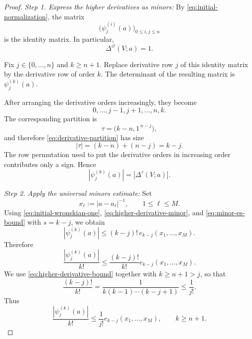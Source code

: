 \documentclass[12pt,letterpaper,reqno]{amsart}
\theoremstyle{definition}
\numberwithin{equation}{section}
\begin{document}
\begin{proof}

\medskip\noindent
\emph{{Step 1. Express the higher derivatives as minors:}}
By \eqref{eq:initial-normalization}, the matrix
\[
\bigl(\psi_j^{(i)}(a)\bigr)_{0\leq i,j\leq n}
\]
is the identity matrix. In particular,
\begin{equation}\label{eq:initial-wronskian-one}
 \Delta^\varnothing(V;a)=1.
\end{equation}

Fix \(j\in\{0,\ldots,n\}\) and \(k\geq n+1\). Replace derivative row
\(j\) of this identity matrix by the derivative row of order \(k\).
The determinant of the resulting matrix is
\(\psi_j^{(k)}(a)\).

After arranging the derivative orders increasingly, they become
\[
0,\ldots,j-1,j+1,\ldots,n,k.
\]
The corresponding partition is
\begin{equation}\label{eq:derivative-partition}
 \tau=
 \bigl(k-n,1^{\,n-j}\bigr),
\end{equation}
and therefore \eqref{eq:derivative-partition} has size
\[
|\tau|
=
(k-n)+(n-j)
=
k-j.
\]
The row permutation used to put the derivative orders in increasing
order contributes only a sign. Hence
\begin{equation}\label{eq:higher-derivative-minor}
 |\psi_j^{(k)}(a)|
 =
 |\Delta^\tau(V;a)|.
\end{equation}

\medskip\noindent
\emph{{Step 2. Apply the universal minors estimate:}}
Set
\[
x_\ell:=|a-a_\ell|^{-1},
\qquad
1\leq\ell\leq M.
\]
Using \eqref{eq:initial-wronskian-one},
\eqref{eq:higher-derivative-minor}, and
\eqref{eq:minor-es-bound} with \(s=k-j\), we obtain
\[
|\psi_j^{(k)}(a)|
\leq
(k-j)!\,
e_{k-j}(x_1,\ldots,x_M).
\]
Therefore
\begin{equation}\label{eq:higher-derivative-bound}
 \frac{|\psi_j^{(k)}(a)|}{k!}
 \leq
 \frac{(k-j)!}{k!}
 e_{k-j}(x_1,\ldots,x_M).
\end{equation}
We use \eqref{eq:higher-derivative-bound} together with
\(k\geq n+1>j\), so that
\[
\frac{(k-j)!}{k!}
=
\frac1{k(k-1)\cdots(k-j+1)}
\leq
\frac1{j!}.
\]
Thus
\begin{equation}\label{eq:higher-derivative-simple}
 \frac{|\psi_j^{(k)}(a)|}{k!}
 \leq
 \frac1{j!}
 e_{k-j}(x_1,\ldots,x_M),
 \qquad k\geq n+1.
\end{equation}


\end{proof}
\end{document}
